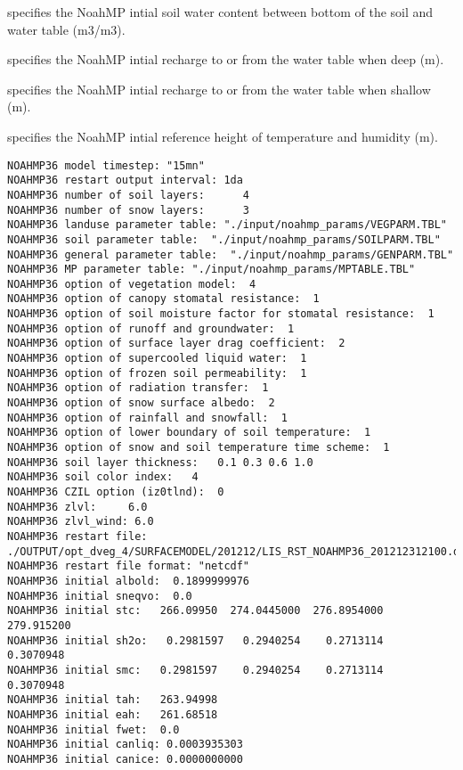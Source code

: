  specifies the NoahMP intial soil water
 content between bottom of the soil and water table (m3/m3).

  specifies the NoahMP intial recharge
 to or from the water table when deep (m).

  specifies the NoahMP intial recharge to
 or from the water table when shallow (m).

  specifies the NoahMP intial reference
 height of temperature and humidity (m).
 

 \begin{Verbatim}[frame=single]
NOAHMP36 model timestep: "15mn"
NOAHMP36 restart output interval: 1da 
NOAHMP36 number of soil layers:      4   
NOAHMP36 number of snow layers:      3   
NOAHMP36 landuse parameter table: "./input/noahmp_params/VEGPARM.TBL"    
NOAHMP36 soil parameter table:  "./input/noahmp_params/SOILPARM.TBL"    
NOAHMP36 general parameter table:  "./input/noahmp_params/GENPARM.TBL"    
NOAHMP36 MP parameter table: "./input/noahmp_params/MPTABLE.TBL"    
NOAHMP36 option of vegetation model:  4    
NOAHMP36 option of canopy stomatal resistance:  1    
NOAHMP36 option of soil moisture factor for stomatal resistance:  1    
NOAHMP36 option of runoff and groundwater:  1    
NOAHMP36 option of surface layer drag coefficient:  2    
NOAHMP36 option of supercooled liquid water:  1    
NOAHMP36 option of frozen soil permeability:  1    
NOAHMP36 option of radiation transfer:  1    
NOAHMP36 option of snow surface albedo:  2    
NOAHMP36 option of rainfall and snowfall:  1    
NOAHMP36 option of lower boundary of soil temperature:  1    
NOAHMP36 option of snow and soil temperature time scheme:  1    
NOAHMP36 soil layer thickness:   0.1 0.3 0.6 1.0    
NOAHMP36 soil color index:   4    
NOAHMP36 CZIL option (iz0tlnd):  0    
NOAHMP36 zlvl:     6.0   
NOAHMP36 zlvl_wind: 6.0    
NOAHMP36 restart file: ./OUTPUT/opt_dveg_4/SURFACEMODEL/201212/LIS_RST_NOAHMP36_201212312100.d01.nc
NOAHMP36 restart file format: "netcdf"
NOAHMP36 initial albold:  0.1899999976    
NOAHMP36 initial sneqvo:  0.0    
NOAHMP36 initial stc:   266.09950  274.0445000  276.8954000  279.915200    
NOAHMP36 initial sh2o:   0.2981597   0.2940254    0.2713114    0.3070948    
NOAHMP36 initial smc:   0.2981597    0.2940254    0.2713114    0.3070948    
NOAHMP36 initial tah:   263.94998    
NOAHMP36 initial eah:   261.68518    
NOAHMP36 initial fwet:  0.0    
NOAHMP36 initial canliq: 0.0003935303    
NOAHMP36 initial canice: 0.0000000000    

\end{Verbatim}
